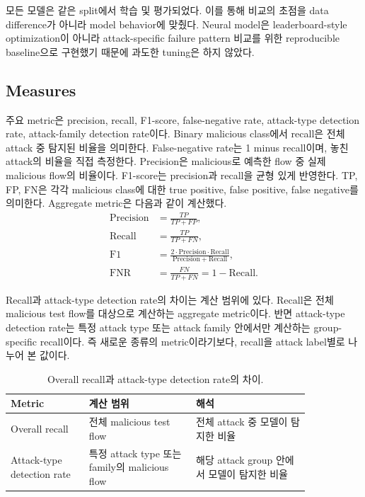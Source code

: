 \documentclass[sigconf,nonacm]{acmart}
\begin{document}
모든 모델은 같은 split에서 학습 및 평가되었다.
이를 통해 비교의 초점을 data difference가 아니라 model behavior에 맞췄다.
Neural model은 leaderboard-style optimization이 아니라 attack-specific failure pattern 비교를 위한 reproducible baseline으로 구현했기 때문에 과도한 tuning은 하지 않았다.

\subsection{Measures}

주요 metric은 precision, recall, F1-score, false-negative rate, attack-type detection rate, attack-family detection rate이다.
Binary malicious class에서 recall은 전체 attack 중 탐지된 비율을 의미한다.
False-negative rate는 1 minus recall이며, 놓친 attack의 비율을 직접 측정한다.
Precision은 malicious로 예측한 flow 중 실제 malicious flow의 비율이다.
F1-score는 precision과 recall을 균형 있게 반영한다.
TP, FP, FN은 각각 malicious class에 대한 true positive, false positive, false negative를 의미한다.
Aggregate metric은 다음과 같이 계산했다.
\begin{equation}
\begin{aligned}
\mathrm{Precision} &= \frac{TP}{TP + FP}, \\
\mathrm{Recall} &= \frac{TP}{TP + FN}, \\
\mathrm{F1} &= \frac{2 \cdot \mathrm{Precision} \cdot \mathrm{Recall}}
{\mathrm{Precision} + \mathrm{Recall}}, \\
\mathrm{FNR} &= \frac{FN}{TP + FN} = 1 - \mathrm{Recall}.
\end{aligned}
\end{equation}

Recall과 attack-type detection rate의 차이는 계산 범위에 있다.
Recall은 전체 malicious test flow를 대상으로 계산하는 aggregate metric이다.
반면 attack-type detection rate는 특정 attack type 또는 attack family 안에서만 계산하는 group-specific recall이다.
즉 새로운 종류의 metric이라기보다, recall을 attack label별로 나누어 본 값이다.

\begin{table}[t]
  \caption{Overall recall과 attack-type detection rate의 차이.}
  \label{tab:recall_definition}
  \centering
  \small
  \begin{tabular}{@{}p{0.22\linewidth}p{0.30\linewidth}p{0.32\linewidth}@{}}
    \toprule
    Metric & 계산 범위 & 해석 \\
    \midrule
    Overall recall & 전체 malicious test flow & 전체 attack 중 모델이 탐지한 비율 \\
    Attack-type detection rate & 특정 attack type 또는 family의 malicious flow & 해당 attack group 안에서 모델이 탐지한 비율 \\
    \bottomrule
  \end{tabular}
\end{table}
\end{document}
